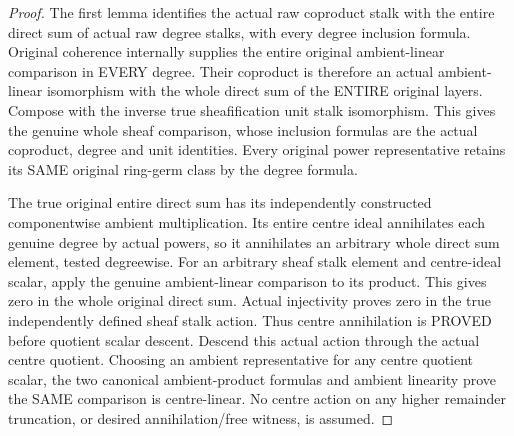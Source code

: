 \begin{proof}
The first lemma identifies the actual raw coproduct stalk with the entire
direct sum of actual raw degree stalks, with every degree inclusion
formula. Original coherence internally supplies the entire original
ambient-linear comparison in EVERY degree. Their coproduct is therefore
an actual ambient-linear isomorphism with the whole direct sum of the
ENTIRE original layers. Compose with the inverse true sheafification
unit stalk isomorphism. This gives the genuine whole sheaf comparison,
whose inclusion formulas are the actual coproduct, degree and unit
identities. Every original power representative retains its SAME
original ring-germ class by the degree formula.

The true original entire direct sum has its independently constructed
componentwise ambient multiplication. Its entire centre ideal annihilates
each genuine degree by actual powers, so it annihilates an arbitrary
whole direct sum element, tested degreewise. For an arbitrary sheaf
stalk element and centre-ideal scalar, apply the genuine ambient-linear
comparison to its product. This gives zero in the whole original direct
sum. Actual injectivity proves zero in the true independently defined
sheaf stalk action. Thus centre annihilation is PROVED before quotient
scalar descent. Descend this actual action through the actual centre
quotient. Choosing an ambient representative for any centre quotient
scalar, the two canonical ambient-product formulas and ambient linearity
prove the SAME comparison is centre-linear. No centre action on any
higher remainder truncation, or desired annihilation/free witness, is
assumed.
\end{proof}

